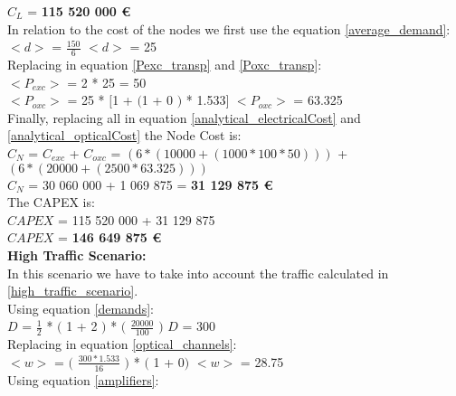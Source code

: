 $C_L$ = \textbf{115 520 000 \euro}\\

In relation to the cost of the nodes we first use the equation \ref{average_demand}:\\

$<d>$ = $\frac{150}{6}$ \qquad \qquad $<d>$ = 25\\

Replacing in equation \ref{Pexc_transp} and \ref{Poxc_transp}:\\

$<P_{exc}>$ = 2 * 25 = 50\\

$<P_{oxc}>$ = 25 * $[$1 + $($1 + $0$ $)$ * 1.533$]$ \qquad \quad $<P_{oxc}>$ = 63.325 \\

Finally, replacing all in equation \ref{analytical_electricalCost} and \ref{analytical_opticalCost} the Node Cost is:\\

$C_N$ = $C_{exc}$ + $C_{oxc}$ = $\left( 6*(10 000 + (1 000 * 100 * 50 ) ) \right)$ + $\left(6*(20 000 + (2 500 * 63.325 ) ) \right)$\\

$C_N$ = 30 060 000 + 1 069 875 = \textbf{31 129 875 \euro}\\

The CAPEX is:\\
$CAPEX$ = 115 520 000 + 31 129 875\\

$CAPEX$ = \textbf{146 649 875 \euro}\\


\textbf{High Traffic Scenario:}\\
In this scenario we have to take into account the traffic calculated in \ref{high_traffic_scenario}.\\

Using equation \ref{demands}:\\

$D$ = $\frac{1}{2}$ * $($ 1 + 2 $)$ * $($ $\frac{20000}{100}$ $)$ \qquad \qquad $D$ = 300\\

Replacing in equation \ref{optical_channels}:\\

$<w>$ = $($ $\frac{300 * 1.533}{16}$ $)$ * $($ 1 + 0$)$ \qquad \qquad $<w>$ = 28.75\\

Using equation \ref{amplifiers}:\\

